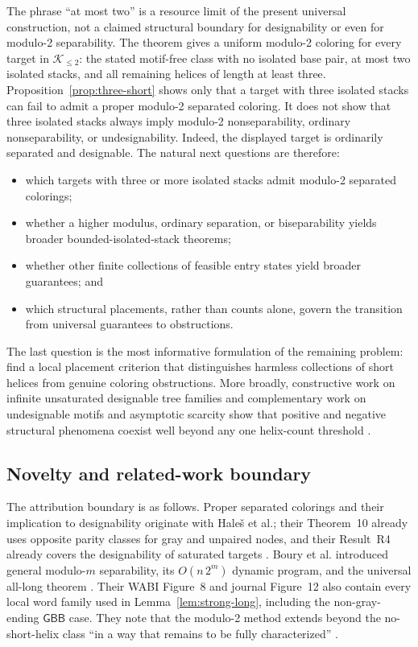 \documentclass[11pt]{article}
\newcommand{\Bcol}{\mathsf{B}}
\newcommand{\Gray}{\mathsf{G}}
\newcommand{\Ktwo}{\mathcal{K}_{\le 2}}
\begin{document}
The phrase ``at most two'' is a resource limit of the present universal construction, not a claimed structural boundary for designability or even for modulo-2 separability.  The theorem gives a uniform modulo-2 coloring for every target in $\Ktwo$: the stated motif-free class with no isolated base pair, at most two isolated stacks, and all remaining helices of length at least three.  Proposition~\ref{prop:three-short} shows only that a target with three isolated stacks can fail to admit a proper modulo-2 separated coloring.  It does not show that three isolated stacks always imply modulo-2 nonseparability, ordinary nonseparability, or undesignability.  Indeed, the displayed target is ordinarily separated and designable.  The natural next questions are therefore:
\begin{itemize}
\item which targets with three or more isolated stacks admit modulo-2 separated colorings;
\item whether a higher modulus, ordinary separation, or biseparability \citep{boury2025seeding} yields broader bounded-isolated-stack theorems;
\item whether other finite collections of feasible entry states yield broader guarantees; and
\item which structural placements, rather than counts alone, govern the transition from universal guarantees to obstructions.
\end{itemize}

The last question is the most informative formulation of the remaining problem: find a local placement criterion that distinguishes harmless collections of short helices from genuine coloring obstructions.  More broadly, constructive work on infinite unsaturated designable tree families and complementary work on undesignable motifs and asymptotic scarcity show that positive and negative structural phenomena coexist well beyond any one helix-count threshold \citep{jedwab2020,yao2026}.

\subsection{Novelty and related-work boundary}

The attribution boundary is as follows.  Proper separated colorings and their implication to designability originate with Hale\v{s} et al.; their Theorem~10 already uses opposite parity classes for gray and unpaired nodes, and their Result~R4 already covers the designability of saturated targets \citep{hales2017}.  Boury et al. introduced general modulo-$m$ separability, its $O(n\,2^m)$ dynamic program, and the universal all-long theorem \citep{boury2024,boury2025}.  Their WABI Figure~8 and journal Figure~12 also contain every local word family used in Lemma~\ref{lem:strong-long}, including the non-gray-ending $\Gray\Bcol\Bcol$ case.  They note that the modulo-2 method extends beyond the no-short-helix class ``in a way that remains to be fully characterized'' \citep{boury2024,boury2025}.
\end{document}
